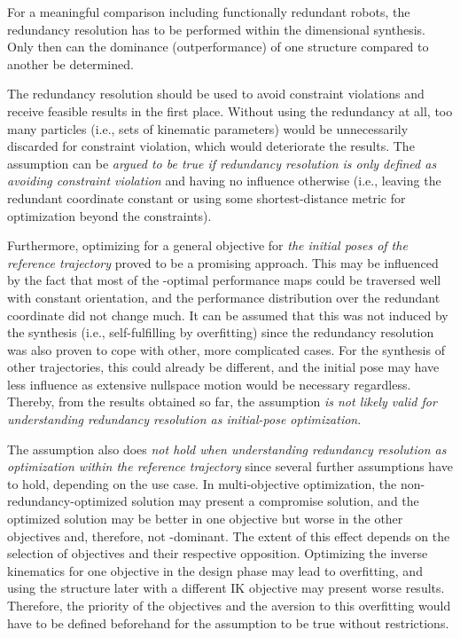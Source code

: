 \begin{Assumption} For a meaningful comparison including functionally redundant robots, the redundancy resolution has to be performed within the dimensional synthesis. Only then can the dominance (outperformance) of one structure compared to another be determined.
\end{Assumption}
%
%
%

\newpage
The redundancy resolution should be used to avoid constraint violations and receive feasible results in the first place.
Without using the redundancy at all, too many particles (i.e., sets of kinematic parameters) would be unnecessarily discarded for constraint violation, which would deteriorate the results.
The assumption can be \emph{argued to be true if redundancy resolution is only defined as avoiding constraint violation} and having no influence otherwise (i.e., leaving the redundant coordinate constant or using some shortest-distance metric for optimization beyond the constraints).

Furthermore, optimizing for a general objective for \emph{the initial poses of the reference trajectory} proved to be a promising approach. %
This may be influenced by the fact that most of the -optimal performance maps could be traversed well with constant orientation, and the performance distribution over the redundant coordinate did not change much.
It can be assumed that this was not induced by the synthesis (i.e., self-fulfilling by overfitting) since the redundancy resolution was also proven to cope with other, more complicated cases.
For the synthesis of other trajectories, %
this could already be different, and the initial pose may have less influence as extensive nullspace motion would be necessary regardless.
%
Thereby, from the results obtained so far, the assumption \emph{is not likely valid for understanding redundancy resolution as initial-pose optimization}.

The assumption also does \emph{not hold when understanding redundancy resolution as optimization within the reference trajectory} since several further assumptions have to hold, depending on the use case.
In multi-objective optimization, the non-redundancy-optimized solution may present a compromise solution, and the optimized solution may be better in one objective but worse in the other objectives and, therefore, not -dominant.
The extent of this effect depends on the selection of objectives and their respective opposition.
Optimizing the inverse kinematics for one objective in the design phase may lead to overfitting, and using the structure later with a different IK objective may present worse results.
Therefore, the priority of the objectives and the aversion to this overfitting would have to be defined beforehand for the assumption to be true without restrictions. %


